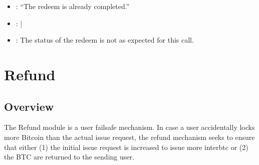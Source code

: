 \documentclass[a4paper,10pt,english]{sphinxmanual}
\begin{document}
\begin{itemize}
\item {} 
: “The redeem is already completed.”

\item {} 
: {\hyperref[\detokenize{spec/redeem:cancelredeem}]{}} | {\hyperref[\detokenize{spec/redeem:executeredeem}]{}}

\item {} 
:  The status of the redeem is not as expected for this call.

\end{itemize}


\chapter{Refund}
\label{\detokenize{spec/refund:refund}}\label{\detokenize{spec/refund:refund-protocol}}\label{\detokenize{spec/refund::doc}}

\section{Overview}
\label{\detokenize{spec/refund:overview}}
The Refund module is a user failsafe mechanism. In case a user accidentally locks more Bitcoin than the actual issue request, the refund mechanism seeks to ensure that either (1) the initial issue request is increased to issue more interbtc or (2) the BTC are returned to the sending user.
\end{document}
